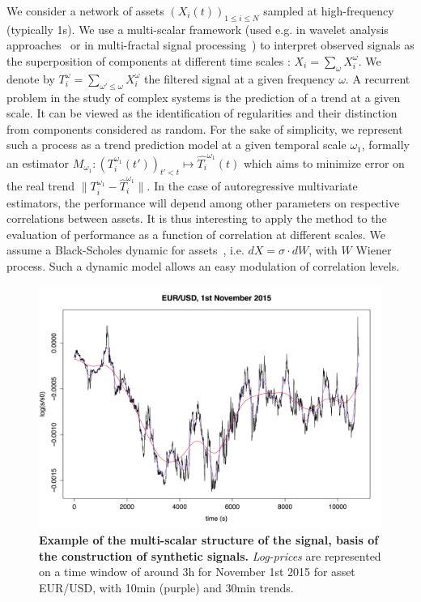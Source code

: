 \documentclass{article}
\newcommand{\norm}[1]{\| #1 \|}
\begin{document}
We consider a network of assets $(X_i(t))_{1\leq i \leq N}$ sampled at high-frequency (typically 1s). We use a multi-scalar framework (used e.g. in wavelet analysis approaches~\cite{ramsey2002wavelets} or in multi-fractal signal processing~\cite{bouchaud2000apparent}) to interpret observed signals as the superposition of components at different time scales : $X_i=\sum_{\omega}{X_i^{\omega}}$. We denote by $T_i^{\omega} = \sum_{\omega' \leq \omega} X_i^{\omega}$ the filtered signal at a given frequency $\omega$. A recurrent problem in the study of complex systems is the prediction of a trend at a given scale. It can be viewed as the identification of regularities and their distinction from components considered as random. For the sake of simplicity, we represent such a process as a trend prediction model at a given temporal scale $\omega_1$, formally an estimator $M_{\omega_1} : (T_i^{\omega_1}(t'))_{t'<t} \mapsto \hat{T_i}^{\omega_1}(t)$ which aims to minimize error on the real trend $\norm{T_i^{\omega_1} - \hat{T}_i^{\omega_1}}$. In the case of autoregressive multivariate estimators, the performance will depend among other parameters on respective correlations between assets. It is thus interesting to apply the method to the evaluation of performance as a function of correlation at different scales. We assume a Black-Scholes dynamic for assets~\cite{jarrow1999honor}, i.e. $dX = \sigma\cdot dW$, with $W$ Wiener process. Such a dynamic model allows an easy modulation of correlation levels.


      
\begin{figure}[h!]
\includegraphics[width=\columnwidth]{ex_filtering.png}
\caption{\textbf{Example of the multi-scalar structure of the signal, basis of the construction of synthetic signals.} \emph{Log-prices} are represented on a time window of around 3h for November 1st 2015 for asset EUR/USD, with 10min (purple) and 30min trends.\label{fig:example_signal}}
\end{figure}
\end{document}
